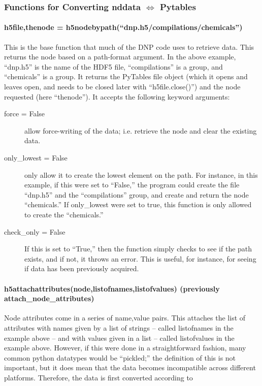 \subsubsection{Functions for Converting nddata $\Leftrightarrow$
    Pytables}
\paragraph{h5file,thenode = h5nodebypath(``dnp.h5/compilations/chemicals'')}
This is the base function that much of the DNP code uses
    to retrieve data.
This returns the node based on a path-format argument.
In the above example, ``dnp.h5'' is the name of the HDF5 file,
    ``compilations'' is a group,
    and ``chemicals'' is a group.
It returns the PyTables file object
    (which it opens and leaves open, and needs to be
    closed later with ``h5file.close()'')
    and the node requested (here ``thenode'').
It accepts the following keyword arguments:
\begin{mykwargs}
    \begin{description}
        \item[force = False] allow force-writing of the data;
            i.e. retrieve the node and clear the existing data.
        \item[only\_lowest = False] only allow it to create the lowest element on the path.
            For instance, in this example, if this were set to ``False,''
            the program could create the file
            ``dnp.h5'' and the ``compilations'' group,
            and create and return the node  ``chemicals.''
            If only\_lowest were set to true,
            this function is only allowed to create the 
            ``chemicals.''
        \item[check\_only = False] If this is set to ``True,'' then
            the function simply checks to see if the path exists,
            and if not, it throws an error.
            This is useful, for instance,
            for seeing if data has been previously acquired.
    \end{description}
\end{mykwargs}
\paragraph{h5attachattributes(node,listofnames,listofvalues) {\tiny (previously attach\_node\_attributes)}}
Node attributes come in a series of name,value pairs.
This attaches the list of attributes with names given by
    a list of strings -- called listofnames in the example above --
    and with values given in a list
    -- called listofvalues in the example above.
However, if this were done in a straightforward fashion,
    many common python datatypes would be ``pickled;''
    the definition of this is not important,
    but it does mean that the data becomes incompatible across
    different platforms.
Therefore, the data is first converted according to 
